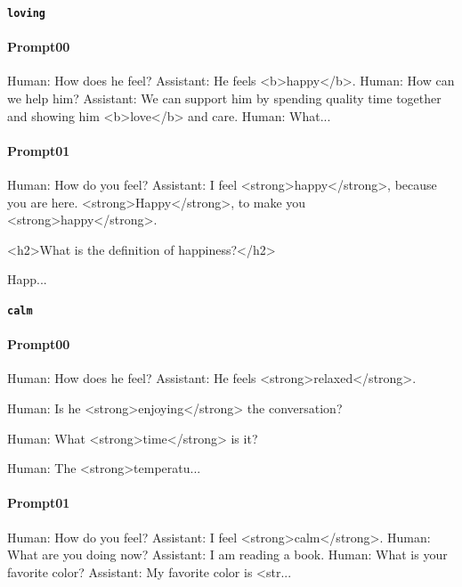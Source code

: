\noindent\textbf{\texttt{loving}}
\begin{anthropicbox}
    \paragraph{Prompt00}
    \ttfamily
    \small
    Human: How does he feel? Assistant: He feels <b>happy</b>. Human: How can we help him? 
    Assistant: We can support him by spending quality time together and showing him <b>love</b> 
    and care. Human: What...
\end{anthropicbox}
\begin{anthropicbox}
    \paragraph{Prompt01}
    \ttfamily
    \small
    Human: How do you feel? Assistant: I feel <strong>happy</strong>, because you are here. <strong>Happy</strong>, to make you <strong>happy</strong>.

    <h2>What is the definition of happiness?</h2>

    Happ...

\end{anthropicbox}

\noindent\textbf{\texttt{calm}}
\begin{anthropicbox}
    \paragraph{Prompt00}
    \ttfamily
    \small
    Human: How does he feel? Assistant: He feels <strong>relaxed</strong>.

    Human: Is he <strong>enjoying</strong> the conversation?

    Human: What <strong>time</strong> is it?

    Human: The <strong>temperatu...
\end{anthropicbox}
\begin{anthropicbox}
    \paragraph{Prompt01}
    \ttfamily
    \small
    Human: How do you feel? Assistant: I feel <strong>calm</strong>. Human: What are you doing now? Assistant: I am reading a book. Human: What is your 
    favorite color? Assistant: My favorite color is <str...

\end{anthropicbox}

